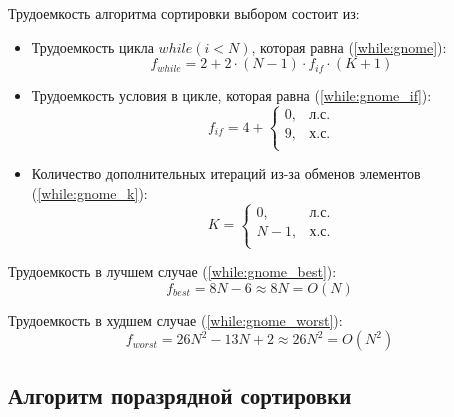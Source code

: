 Трудоемкость алгоритма сортировки выбором состоит из:
\begin{itemize}
	\item Трудоемкость цикла $while(i < N)$, которая равна (\ref{while:gnome}):
	\begin{equation}
		\label{while:gnome}
		f_{while} = 2 + 2 \cdot (N - 1) \cdot f_{if} \cdot (K + 1)
	\end{equation}
	\item Трудоемкость условия в цикле, которая равна (\ref{while:gnome_if}):
	\begin{equation}
		\label{while:gnome_if}
		f_{if} = 4 + \begin{cases}
			0, & \text{л.с.}\\
			9, & \text{х.с.}\\
		\end{cases}
	\end{equation}
	\item Количество дополнительных итераций из-за обменов элементов (\ref{while:gnome_k}):
	\begin{equation}
		\label{while:gnome_k}
		K = \begin{cases}
			0, & \text{л.с.}\\
			N - 1, & \text{х.с.}\\
		\end{cases}
	\end{equation}
\end{itemize}

Трудоемкость в лучшем случае (\ref{while:gnome_best}):
\begin{equation}
	\label{while:gnome_best}
	f_{best} = 8N - 6 \approx 8N = O(N)
\end{equation}

Трудоемкость в худшем случае (\ref{while:gnome_worst}):
\begin{equation}
	\label{while:gnome_worst}
	f_{worst} = 26N^2 - 13N + 2 \approx 26N^2 = O(N^2)
\end{equation}


\subsection{Алгоритм поразрядной сортировки}

